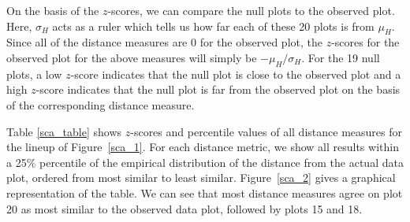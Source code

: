 \documentclass[12]{report}
\begin{document}


On the basis of the $z$-scores, we can compare the null plots to the observed plot. Here, $\sigma_H$ acts as a ruler which tells us how far each of these 20 plots is from $\mu_H$. Since all of the distance measures are 0 %
for the observed plot, the $z$-scores for the observed plot for the above measures will simply be $-\mu_H/\sigma_H$. For the 19 null plots, a low $z$-score indicates that the null plot is close to the observed plot and a high $z$-score indicates that the null plot is far from the observed plot on the basis of the corresponding distance measure. 

Table \ref{sca_table} shows $z$-scores and percentile values of all distance measures for the lineup of Figure~\ref{sca_1}. %
For each distance metric, we show all results within a 25\% percentile of the empirical distribution of the distance from the actual data plot, ordered from most similar to least similar. 
Figure~\ref{sca_2} gives a graphical representation of the table. We can see that most distance measures agree on plot 20 as most similar  to the observed data plot, followed by plots 15 and 18.

\end{document}
